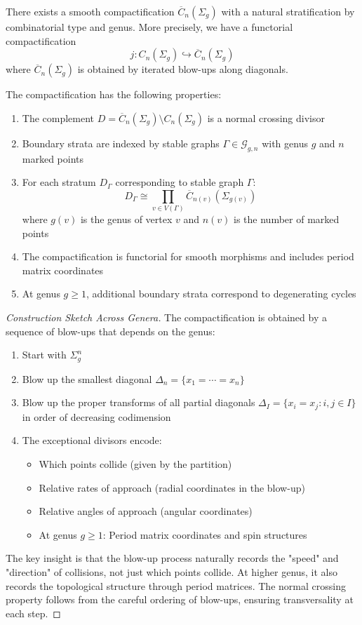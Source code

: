 \begin{theorem}\label{thm:FM}
There exists a smooth compactification $\overline{C}_n(\Sigma_g)$ with a natural stratification by combinatorial type and genus. More precisely, we have
a functorial compactification
\[j: C_n(\Sigma_g) \hookrightarrow \overline{C}_n(\Sigma_g)\]
where $\overline{C}_n(\Sigma_g)$ is obtained by iterated blow-ups along diagonals.

The compactification has the following properties:
\begin{enumerate}
\item The complement $D = \overline{C}_n(\Sigma_g) \setminus C_n(\Sigma_g)$ is a normal crossing divisor
\item Boundary strata are indexed by stable graphs $\Gamma \in \mathcal{G}_{g,n}$ with genus $g$ and $n$ marked points
\item For each stratum $D_\Gamma$ corresponding to stable graph $\Gamma$:
\[
D_\Gamma \cong \prod_{v \in V(\Gamma)} \overline{C}_{n(v)}(\Sigma_{g(v)})
\]
where $g(v)$ is the genus of vertex $v$ and $n(v)$ is the number of marked points
\item The compactification is functorial for smooth morphisms and includes period matrix coordinates
\item At genus $g \geq 1$, additional boundary strata correspond to degenerating cycles
\end{enumerate}
\end{theorem}
 
\begin{proof}[Construction Sketch Across Genera]
The compactification is obtained by a sequence of blow-ups that depends on the genus:
\begin{enumerate}
\item Start with $\Sigma_g^n$
\item Blow up the smallest diagonal $\Delta_n = \{x_1 = \cdots = x_n\}$
\item Blow up the proper transforms of all partial diagonals $\Delta_I = \{x_i = x_j : i,j \in I\}$ in order of decreasing codimension
\item The exceptional divisors encode:
\begin{itemize}
\item Which points collide (given by the partition)
\item Relative rates of approach (radial coordinates in the blow-up)
\item Relative angles of approach (angular coordinates)
\item At genus $g \geq 1$: Period matrix coordinates and spin structures
\end{itemize}
\end{enumerate}
 
The key insight is that the blow-up process naturally records the "speed" and "direction" of collisions, not just which points collide. At higher genus, it also records the topological structure through period matrices. The normal crossing property follows from the careful ordering of blow-ups, ensuring transversality at each step.
\end{proof}
 

